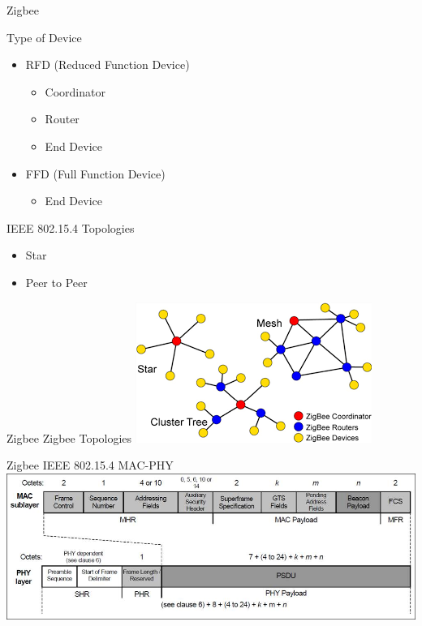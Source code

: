 \documentclass[serif,Blue]{beamer}
\begin{document}
\begin{frame}{Zigbee}
	\begin{block}{Type of Device}
		\begin{itemize}\justifying{}
			\item RFD (Reduced Function Device)
			\begin{itemize}\justifying{}
				\item Coordinator
				\item Router
				\item End Device
			\end{itemize}
			\item FFD (Full Function Device)
			\begin{itemize}\justifying{}
				\item End Device
			\end{itemize}
		\end{itemize}
	\end{block}
	\begin{block}{IEEE 802.15.4 Topologies}
		\begin{itemize}\justifying{}
			\item Star
			\item Peer to Peer
		\end{itemize}
	\end{block}
\end{frame}

\begin{frame}{Zigbee}
	Zigbee Topologies
	\center\includegraphics[scale=.7]{img/ztopo.png}
\end{frame}

\begin{frame}{Zigbee}
	IEEE 802.15.4 MAC-PHY
	\center\includegraphics[scale=.4]{img/154frame.jpg}
\end{frame}
\end{document}
